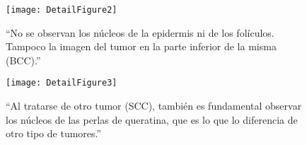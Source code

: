 \documentclass[../main.tex]{subfiles}
\begin{document}
\begin{figure}[H]
\centering
\texttt{[image: DetailFigure2]}
\caption{``No se observan los núcleos de la epidermis ni de los folículos.
Tampoco la imagen del tumor en la parte inferior de la misma (BCC).''}
\end{figure}

\begin{figure}
\centering
\texttt{[image: DetailFigure3]}
\caption{``Al tratarse de otro tumor (SCC), también es fundamental observar los
núcleos de las perlas de queratina, que es lo que lo diferencia de otro tipo
de tumores.''}
\end{figure}
\end{document}
